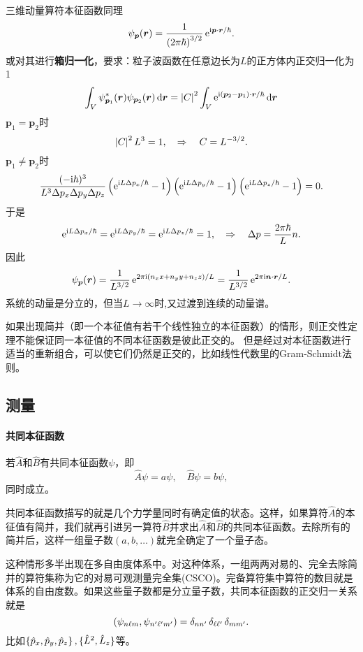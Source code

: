 三维动量算符本征函数同理
\[
	\psi_{\bm p}(\bm r)=\frac1{\left(2\pi\hbar\right)^{3/2}}\mathop{}\!\mathrm{e}^{\mathrm{i}\bm p\cdot\bm r/\hbar}.
\]
或对其进行\textbf{箱归一化}，要求：粒子波函数在任意边长为$L$的正方体内正交归一化为1
\[
	\int_V\psi_{\bm p_1}^\ast(\bm r)\psi_{\bm p_2}(\bm r)\mathop{}\!\mathrm{d}\bm r=\left\lvert C\right\rvert^2\int_V\mathop{}\!\mathrm{e}^{\mathrm{i}(\bm p_2-\bm p_1)\cdot\bm r/\hbar}\mathop{}\!\mathrm{d}\bm r
\]
$\bm p_1=\bm p_2$时
\[
	\left\lvert C\right\rvert^2L^3=1,\quad\Rightarrow\quad C=L^{-3/2}.
\]
$\bm p_1\neq\bm p_2$时
\[
	\frac{(-\mathrm{i}\hbar)^3}{L^3\Delta p_x\Delta p_y\Delta p_z}\left(\mathop{}\!\mathrm{e}^{\mathrm{i} L\Delta p_x/\hbar}-1\right)\left(\mathop{}\!\mathrm{e}^{\mathrm{i} L\Delta p_y/\hbar}-1\right)\left(\mathop{}\!\mathrm{e}^{\mathrm{i} L\Delta p_z/\hbar}-1\right)=0.
\]
于是
\[
	\mathop{}\!\mathrm{e}^{\mathrm{i} L\Delta p_x/\hbar}=\mathop{}\!\mathrm{e}^{\mathrm{i} L\Delta p_y/\hbar}=\mathop{}\!\mathrm{e}^{\mathrm{i} L\Delta p_z/\hbar}=1,\quad\Rightarrow\quad\Delta p=\frac{2\pi\hbar}Ln.
\]
因此
\[
	\psi_{\bm p}(\bm r)=\frac1{L^{3/2}}\mathop{}\!\mathrm{e}^{2\pi\mathrm{i}(n_xx+n_yy+n_zz)/L}=\frac1{L^{3/2}}\mathop{}\!\mathrm{e}^{2\pi\mathrm{i}\bm n\cdot\bm r/L}.
\]
系统的动量是分立的，但当$L\to\infty$时,又过渡到连续的动量谱。

如果出现简并（即一个本征值有若干个线性独立的本征函数）的情形，则正交性定理不能保证同一本征值的不同本征函数是彼此正交的。
但是经过对本征函数进行适当的重新组合，可以使它们仍然是正交的，比如线性代数里的Gram-Schmidt法则。
\subsection{测量}
\paragraph*{共同本征函数}
若$\hat A$和$\hat B$有共同本征函数$\psi$，即
\[
	\hat A\psi=a\psi,\quad\hat B\psi=b\psi,
\]
同时成立。

共同本征函数描写的就是几个力学量同时有确定值的状态。这样，如果算符$\hat A$的本征值有简并，我们就再引进另一算符$\hat B$并求出$\hat A$和$\hat B$的共同本征函数。去除所有的简并后，这样一组量子数$(a,b,\ldots)$就完全确定了一个量子态。

这种情形多半出现在多自由度体系中。对这种体系，一组两两对易的、完全去除简并的算符集称为它的对易可观测量完全集(CSCO)。完备算符集中算符的数目就是体系的自由度数。如果这些量子数都是分立量子数，共同本征函数的正交归一关系就是
\[
	\left(\psi_{n\ell m},\psi_{n'\ell'm'}\right)=\mathop{}\!\delta_{nn'}\mathop{}\!\delta_{\ell\ell'}\mathop{}\!\delta_{mm'}.
\]
比如$\left\{\hat p_x,\hat p_y,\hat p_z\right\},\{\hat L^2,\hat L_z\}$等。

